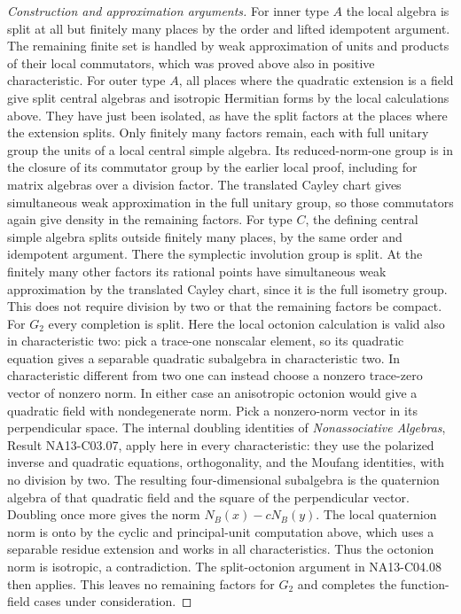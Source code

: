 \documentclass[11pt,a4paper,openany,oneside]{book}
\theoremstyle{resultstyle}
\theoremstyle{definition}
\numberwithin{equation}{chapter}
\begin{document}
\begin{proof}[Construction and approximation arguments]
For inner type \(A\) the local algebra is split at
all but finitely many places by the order and lifted
idempotent argument. The remaining finite set is
handled by weak approximation of units and products
of their local commutators, which was proved above
also in positive characteristic.
For outer type \(A\), all places where the quadratic
extension is a field give split central algebras and
isotropic Hermitian forms by the local calculations
above. They have just been isolated, as have the
split factors at the places where the extension splits.
Only finitely many factors remain, each with full
unitary group the units of a local central simple
algebra. Its reduced-norm-one group is in the closure
of its commutator group by the earlier local proof,
including for matrix algebras over a division factor.
The translated Cayley chart gives simultaneous weak
approximation in the full unitary group, so those
commutators again give density in the remaining factors.
For type \(C\), the defining central simple algebra
splits outside finitely many places, by the same order
and idempotent argument. There the symplectic
involution group is split. At the finitely many other
factors its rational points have simultaneous weak
approximation by the translated Cayley chart, since
it is the full isometry group. This does not require
division by two or that the remaining factors be compact.
For \(G_2\) every completion is split. Here the local
octonion calculation is valid also in characteristic
two: pick a trace-one nonscalar element, so its
quadratic equation gives a separable quadratic
subalgebra in characteristic two. In characteristic
different from two one can instead choose a
nonzero trace-zero vector of nonzero norm.
In either case an anisotropic octonion would give
a quadratic field with nondegenerate norm. Pick a
nonzero-norm vector in its perpendicular space.
The internal doubling identities of
\emph{Nonassociative Algebras}, Result NA13-C03.07,
apply here in every characteristic: they use the
polarized inverse and quadratic equations, orthogonality,
and the Moufang identities, with no division by two.
The resulting four-dimensional subalgebra is the
quaternion algebra of that quadratic field and the
square of the perpendicular vector. Doubling once
more gives the norm \(N_B(x)-cN_B(y)\). The
local quaternion norm is onto by the cyclic and
principal-unit computation above, which uses a
separable residue extension and works in all
characteristics. Thus the octonion norm is
isotropic, a contradiction. The split-octonion
argument in NA13-C04.08 then applies. This leaves
no remaining factors for \(G_2\) and completes the
function-field cases under consideration.


\end{proof}
\end{document}
